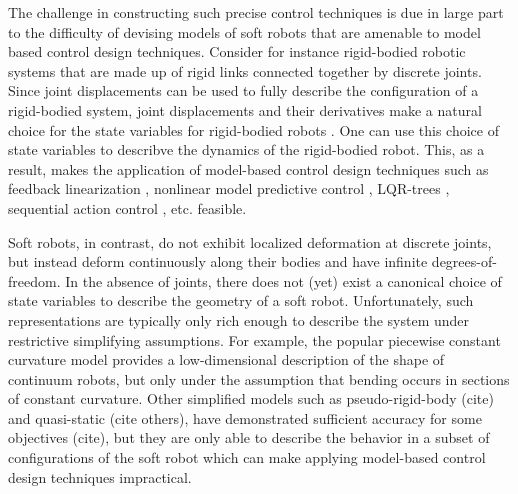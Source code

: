 The challenge in constructing such precise control techniques is due in large part to the difficulty of devising models of soft robots that are amenable to model based control design techniques.
Consider for instance rigid-bodied robotic systems that are made up of rigid links connected together by discrete joints.
Since joint displacements can be used to fully describe the configuration of a rigid-bodied system, joint displacements and their derivatives make a natural choice for the state variables for rigid-bodied robots \cite{spong2008robot}.
One can use this choice of state variables to describve the dynamics of the rigid-bodied robot.
This, as a result, makes the application of model-based control design techniques such as feedback linearization \cite{}, nonlinear model predictive control \cite{}, LQR-trees \cite{}, sequential action control \cite{ansari2016sequential}, etc. feasible.  

Soft robots, in contrast, do not exhibit localized deformation at discrete joints, but instead deform continuously along their bodies and have infinite degrees-of-freedom.
In the absence of joints, there does not (yet) exist a canonical choice of state variables to describe the geometry of a soft robot.
Unfortunately, such representations are typically only rich enough to describe the system under restrictive simplifying assumptions.
For example, the popular piecewise constant curvature model \cite{webster2010design} provides a low-dimensional description of the shape of continuum robots, but only under the assumption that bending occurs in sections of constant curvature.
Other simplified models such as pseudo-rigid-body (cite) and quasi-static \cite{bruder2018iros} (cite others), have demonstrated sufficient accuracy for some objectives (cite),
but they are only able to describe the behavior in a subset of configurations of the soft robot which can make applying model-based control design techniques impractical. 

